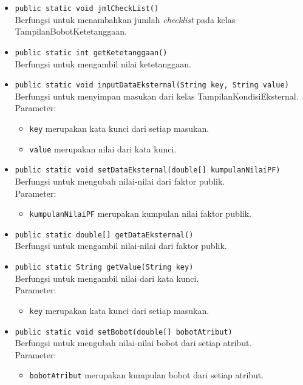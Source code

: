 \begin{itemize}
		\item \texttt{public static void jmlCheckList()}\\
		Berfungsi untuk menambahkan jumlah \textit{checklist} pada kelas TampilanBobotKetetanggaan.
		
		\item \texttt{public static int getKetetanggaan()}\\
		Berfungsi untuk mengambil nilai ketetanggaan.
		
		\item \texttt{public static void inputDataEksternal(String key, String value)}\\
		Berfungsi untuk menyimpan masukan dari kelas TampilanKondisiEksternal.\\
		Parameter:
		\begin{itemize}
			\item \texttt{key} merupakan kata kunci dari setiap masukan.
			\item \texttt{value} merupakan nilai dari kata kunci.
		\end{itemize}
		
		\item \texttt{public static void setDataEksternal(double[] kumpulanNilaiPF)}\\
		Berfungsi untuk mengubah nilai-nilai dari faktor publik.\\
		Parameter:
		\begin{itemize}
			\item \texttt{kumpulanNilaiPF} merupakan kumpulan nilai faktor publik.
		\end{itemize}
		
		\item \texttt{public static double[] getDataEksternal()}\\
		Berfungsi untuk mengambil nilai-nilai dari faktor publik.
		
		\item \texttt{public static String getValue(String key)}\\
		Berfungsi untuk mengambil nilai dari kata kunci.\\
		Parameter:
		\begin{itemize}
			\item \texttt{key} merupakan kata kunci dari setiap masukan.
		\end{itemize}
		
		\item \texttt{public static void setBobot(double[] bobotAtribut)}\\
		Berfungsi untuk mengubah nilai-nilai bobot dari setiap atribut.\\
		Parameter:
		\begin{itemize}
			\item \texttt{bobotAtribut} merupakan kumpulan bobot dari setiap atribut.
		\end{itemize}
		

\end{itemize}

